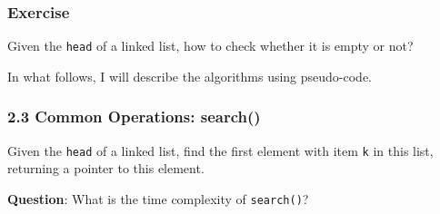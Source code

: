 \documentclass[aspectratio=169, 14pt]{beamer}
\begin{document}
\begin{frame}
    \frametitle{Exercise}
{\large {}} Given the \alert{\texttt{head}} of a linked list, how to check whether it is empty or not?
    
\pause

\end{frame}

{
\begin{frame}[standout]
  In what follows, I will describe the algorithms using pseudo-code.
\end{frame}
}

\begin{frame}
    \frametitle{2.3 Common Operations: search()}
    Given the \alert{\texttt{head}} of a linked list, find the first element with item \alert{\texttt{k}} in this list, returning a pointer to this element. 
    

\pause
{\large {}} \textbf{Question}: What is the time complexity of \texttt{search()}?
\end{frame}
\end{document}
